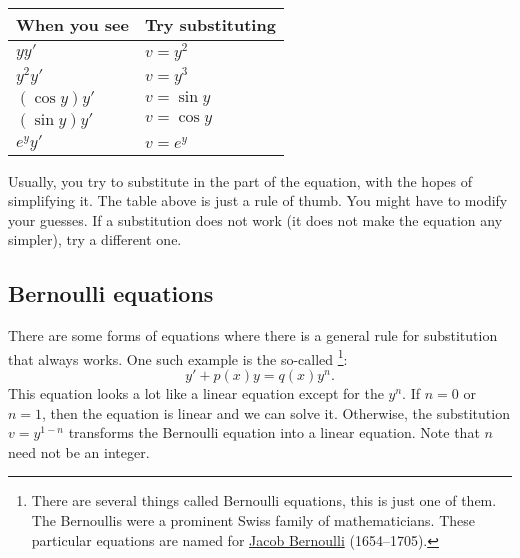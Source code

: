 \begin{center}
\begin{tabular}{@{}ll@{}}
\toprule
When you see & Try substituting \\
\midrule
$yy'$ & $v=y^2$ \\
$y^2y'$ & $v=y^3$ \\
$(\cos y)y'$ & $v=\sin y$ \\
$(\sin y)y'$ & $v=\cos y$ \\
$e^y y'$ & $v=e^y$ \\ \bottomrule
\end{tabular}
\end{center}

Usually, you try to substitute in the  part of the
equation, with the hopes of simplifying it.  The table above is just a rule
of thumb.  You might have to modify your guesses.  If a substitution
does not work (it does not make the equation any simpler), try a different one.

\subsection{Bernoulli equations}

There are some forms of equations where there is a
general rule for substitution that always works.
One such example is the so-called
\emph{}%
\footnote{There are several things called Bernoulli equations, this is just one
of them.  The Bernoullis were a prominent Swiss family of mathematicians.  These
particular equations are named for
\href{https://en.wikipedia.org/wiki/Jacob_Bernoulli}{Jacob Bernoulli} (1654--1705).}:
\begin{equation*}
y' + p(x)y = q(x)y^n .
\end{equation*}
This equation
looks a lot like a linear equation except for the $y^n$.  If $n=0$ or
$n=1$, then the equation is linear and we can solve it.  Otherwise,
the substitution $v=y^{1-n}$ transforms the 
Bernoulli equation into a linear equation.  Note that $n$
need not be an integer.

